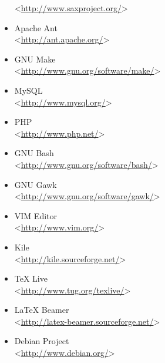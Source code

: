 \begin{itemize}
 <\url{http://www.saxproject.org/}>
 \item Apache Ant\\
 <\url{http://ant.apache.org/}>
 \item GNU Make\\
 <\url{http://www.gnu.org/software/make/}>
 \item MySQL\\
 <\url{http://www.mysql.org/}>
 \item PHP\\
 <\url{http://www.php.net/}>
 \item GNU Bash\\
 <\url{http://www.gnu.org/software/bash/}>
 \item GNU Gawk\\
 <\url{http://www.gnu.org/software/gawk/}>
 \item VIM Editor\\
 <\url{http://www.vim.org/}>
 \item Kile\\
 <\url{http://kile.sourceforge.net/}>
 \item \TeX{} Live\\
 <\url{http://www.tug.org/texlive/}>
 \item \LaTeX{} Beamer\\
 <\url{http://latex-beamer.sourceforge.net/}>
 \item Debian Project\\
 <\url{http://www.debian.org/}>
  \end{itemize}
